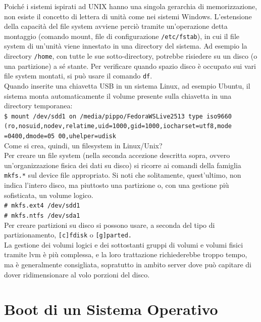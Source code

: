 \documentclass[a4paper]{report}
\newcommand\tab[1][1cm]{\hspace*{#1}}
\begin{document}
Poiché i sistemi ispirati ad UNIX hanno una singola gerarchia di memorizzazione, non esiste il concetto di lettera di unità come
nei sistemi Windows. L'estensione della capacità del file system avviene perciò tramite un'operazione detta montaggio (comando
mount, file di configurazione \texttt{/etc/fstab}), in cui il file system di un'unità viene innestato in una directory del sistema. Ad esempio
la directory \texttt{/home}, con tutte le sue sotto-directory, potrebbe risiedere su un disco (o una partizione) a sé stante. Per verificare
quando spazio disco è occupato sui vari file system montati, si può usare il comando \texttt{df}.\\
Quando inserite una chiavetta USB in un sistema Linux, ad esempio Ubuntu, il sistema monta
automaticamente il volume presente sulla chiavetta in una directory temporanea:\\
\tab\texttt{\$ mount
/dev/sdd1 on /media/pippo/FedoraWSLive2513
type iso9660\\\tab(ro,nosuid,nodev,relatime,uid=1000,gid=1000,iocharset=utf8,mode\\\tab=0400,dmode=05
00,uhelper=udisk}\\
Come si crea, quindi, un filesystem in Linux/Unix?\\
Per creare un file system (nella seconda accezione descritta sopra, ovvero
un'organizzazione fisica dei dati su disco) si ricorre ai comandi della famiglia \texttt{mkfs.*} sul
device file appropriato. Si noti che solitamente, quest'ultimo, non indica l'intero disco,
ma piuttosto una partizione o, con una gestione più sofisticata, un volume logico.\\
\tab\texttt{\# mkfs.ext4 /dev/sdd1}\\
\tab\texttt{\# mkfs.ntfs /dev/sda1}\\

Per creare partizioni su disco si possono usare, a seconda del tipo di partizionamento,
\texttt{[c]fdisk} o \texttt{[g]parted.}\\
La gestione dei volumi logici e dei sottostanti gruppi di volumi e volumi fisici tramite lvm
è più complessa, e la loro trattazione richiederebbe troppo tempo, ma è generalmente
consigliata, sopratutto in ambito server dove può capitare di dover ridimensionare al
volo porzioni del disco.


\chapter{Boot di un Sistema Operativo}
\end{document}

